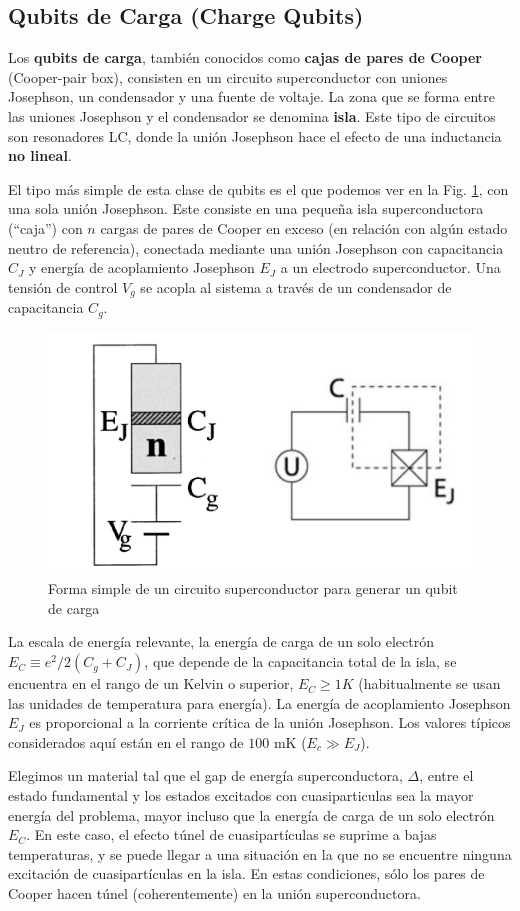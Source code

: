 \subsection{Qubits de Carga (Charge Qubits)}

Los \textbf{qubits de carga}, también conocidos como \textbf{cajas de pares de Cooper} (Cooper-pair box), consisten en un circuito superconductor con uniones Josephson, un condensador y una fuente de voltaje. La zona que se forma entre las uniones Josephson y el condensador se denomina \textbf{isla}. Este tipo de circuitos son resonadores LC, donde la unión Josephson hace el efecto de una inductancia \textbf{no lineal}.

El tipo más simple de esta clase de qubits es el que podemos ver en la Fig. \ref{Fig_scq_charge_qubit}, con una sola unión Josephson.  Este consiste en una pequeña isla superconductora (``caja'') con $n$ cargas de pares de Cooper en exceso (en relación con algún estado neutro de referencia), conectada mediante una unión Josephson con capacitancia $C_J$ y energía de acoplamiento Josephson $E_J$ a un electrodo superconductor. Una tensión de control $V_g$ se acopla al sistema a través de un condensador de capacitancia $C_g$. 

	\begin{figure}[b]
	\centering 
	\includegraphics[width=0.5\linewidth]{Figuras/Fig_scq_charge_qubit.png}
	\caption{Forma simple de un circuito superconductor para generar un qubit de carga}
	\label{Fig_scq_charge_qubit}
	\end{figure}

La escala de energía relevante, la energía de carga de un solo electrón $E_C \equiv e^2/2(C_g+C_J)$, que depende de la capacitancia total de la isla, se encuentra en el rango de un Kelvin o superior, $E_C \geq 1 K$ (habitualmente se usan las unidades de temperatura para energía). La energía de acoplamiento Josephson $E_J$ es proporcional a la corriente crítica de la unión Josephson. Los valores típicos considerados aquí están en el rango de $100$ mK ($E_c \gg E_J$). 

Elegimos un material tal que el gap de energía superconductora, $\Delta$, entre el estado fundamental y los estados excitados con cuasiparticulas sea la mayor energía del problema, mayor incluso que la energía de carga de un solo electrón $E_C$. En este caso, el efecto túnel de cuasipartículas se suprime a bajas temperaturas, y se puede llegar a una situación en la que no se encuentre ninguna excitación de cuasipartículas en la isla. En estas condiciones, sólo los pares de Cooper hacen túnel (coherentemente) en la unión superconductora. 

